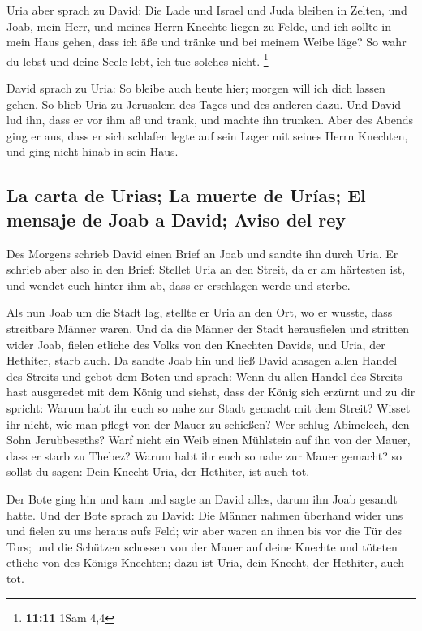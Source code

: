 Uria aber sprach zu David: Die Lade und Israel und Juda
bleiben in Zelten, und Joab, mein Herr, und meines Herrn Knechte liegen
zu Felde, und ich sollte in mein Haus gehen, dass ich äße und tränke und
bei meinem Weibe läge? So wahr du lebst und deine Seele lebt, ich tue
solches nicht. \footnote{\textbf{11:11} 1Sam 4,4}

 David sprach zu Uria: So bleibe auch heute hier; morgen
will ich dich lassen gehen. So blieb Uria zu Jerusalem des Tages und des
anderen dazu.  Und David lud ihn, dass er vor ihm aß und
trank, und machte ihn trunken. Aber des Abends ging er aus, dass er sich
schlafen legte auf sein Lager mit seines Herrn Knechten, und ging nicht
hinab in sein Haus.

\hypertarget{la-carta-de-urias-la-muerte-de-uruxedas-el-mensaje-de-joab-a-david-aviso-del-rey}{%
\subsection{La carta de Urias; La muerte de Urías; El mensaje de Joab a
David; Aviso del
rey}\label{la-carta-de-urias-la-muerte-de-uruxedas-el-mensaje-de-joab-a-david-aviso-del-rey}}

 Des Morgens schrieb David einen Brief an Joab und sandte
ihn durch Uria.  Er schrieb aber also in den Brief:
Stellet Uria an den Streit, da er am härtesten ist, und wendet euch
hinter ihm ab, dass er erschlagen werde und sterbe.

 Als nun Joab um die Stadt lag, stellte er Uria an den
Ort, wo er wusste, dass streitbare Männer waren.  Und da
die Männer der Stadt herausfielen und stritten wider Joab, fielen
etliche des Volks von den Knechten Davids, und Uria, der Hethiter, starb
auch.  Da sandte Joab hin und ließ David ansagen allen
Handel des Streits  und gebot dem Boten und sprach: Wenn
du allen Handel des Streits hast ausgeredet mit dem König
 und siehst, dass der König sich erzürnt und zu dir
spricht: Warum habt ihr euch so nahe zur Stadt gemacht mit dem Streit?
Wisset ihr nicht, wie man pflegt von der Mauer zu schießen?
 Wer schlug Abimelech, den Sohn Jerubbeseths? Warf nicht
ein Weib einen Mühlstein auf ihn von der Mauer, dass er starb zu Thebez?
Warum habt ihr euch so nahe zur Mauer gemacht? so sollst du sagen: Dein
Knecht Uria, der Hethiter, ist auch tot.

 Der Bote ging hin und kam und sagte an David alles,
darum ihn Joab gesandt hatte.  Und der Bote sprach zu
David: Die Männer nahmen überhand wider uns und fielen zu uns heraus
aufs Feld; wir aber waren an ihnen bis vor die Tür des Tors;
 und die Schützen schossen von der Mauer auf deine
Knechte und töteten etliche von des Königs Knechten; dazu ist Uria, dein
Knecht, der Hethiter, auch tot.

